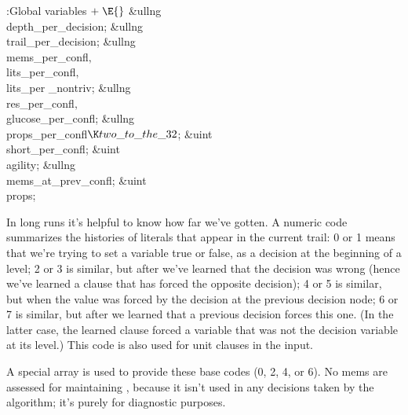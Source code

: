 \B{}:Global variables\X${}\mathrel+\E{}$\6
\&{ullng} \\{depth\_per\_decision};\6
\&{ullng} \\{trail\_per\_decision};\6
\&{ullng} \\{mems\_per\_confl}${},{}$ \\{lits\_per\_confl}${},{}$ \\{lits\_per%
\_nontriv};\6
\&{ullng} \\{res\_per\_confl}${},{}$ \\{glucose\_per\_confl};\6
\&{ullng} \\{props\_per\_confl}${}\K\\{two\_to\_the\_32}{}$;\6
\&{uint} \\{short\_per\_confl};\6
\&{uint} \\{agility};\6
\&{ullng} \\{mems\_at\_prev\_confl};\6
\&{uint} \\{props};\par
\fi

In long runs it's helpful to know how far we've gotten. A
numeric code
summarizes the histories of literals that appear in the current trail:
0 or 1 means that we're trying to set a variable
true or false, as a decision at the beginning of a level;
2 or 3 is similar, but after we've learned that the decision was wrong (hence
we've learned a clause that has forced the opposite decision);
4 or 5 is similar, but when the value was forced by
the decision at the previous decision node;
6 or 7 is similar, but after we learned that a previous decision
forces this one. (In the latter case, the learned clause forced a
variable that was not the decision variable at its level.)
This code is also used for unit clauses in the input.

A special  array is used to provide these base codes (0, 2, 4,
or 6).
No mems are assessed for maintaining , because it isn't used
in any decisions taken by the algorithm; it's purely for diagnostic purposes.

